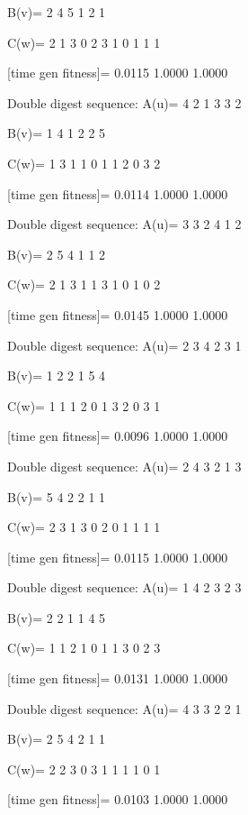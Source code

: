 B(v)=
     2     4     5     1     2     1

C(w)=
     2     1     3     0     2     3     1     0     1     1     1

[time gen fitness]=
    0.0115    1.0000    1.0000

Double digest sequence:
A(u)=
     4     2     1     3     3     2

B(v)=
     1     4     1     2     2     5

C(w)=
     1     3     1     1     0     1     1     2     0     3     2

[time gen fitness]=
    0.0114    1.0000    1.0000

Double digest sequence:
A(u)=
     3     3     2     4     1     2

B(v)=
     2     5     4     1     1     2

C(w)=
     2     1     3     1     1     3     1     0     1     0     2

[time gen fitness]=
    0.0145    1.0000    1.0000

Double digest sequence:
A(u)=
     2     3     4     2     3     1

B(v)=
     1     2     2     1     5     4

C(w)=
     1     1     1     2     0     1     3     2     0     3     1

[time gen fitness]=
    0.0096    1.0000    1.0000

Double digest sequence:
A(u)=
     2     4     3     2     1     3

B(v)=
     5     4     2     2     1     1

C(w)=
     2     3     1     3     0     2     0     1     1     1     1

[time gen fitness]=
    0.0115    1.0000    1.0000

Double digest sequence:
A(u)=
     1     4     2     3     2     3

B(v)=
     2     2     1     1     4     5

C(w)=
     1     1     2     1     0     1     1     3     0     2     3

[time gen fitness]=
    0.0131    1.0000    1.0000

Double digest sequence:
A(u)=
     4     3     3     2     2     1

B(v)=
     2     5     4     2     1     1

C(w)=
     2     2     3     0     3     1     1     1     1     0     1

[time gen fitness]=
    0.0103    1.0000    1.0000


